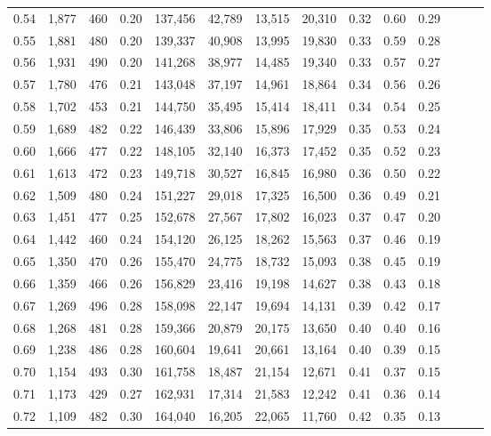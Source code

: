 \begin{tabular}{rrrrrrrrrrrrrr}
0.54 &  1,877 &    460 &  0.20 &  137,456 &   42,789 &  13,515 &  20,310 &  0.32 &  0.60 &      0.29 \\
0.55 &  1,881 &    480 &  0.20 &  139,337 &   40,908 &  13,995 &  19,830 &  0.33 &  0.59 &      0.28 \\
0.56 &  1,931 &    490 &  0.20 &  141,268 &   38,977 &  14,485 &  19,340 &  0.33 &  0.57 &      0.27 \\
0.57 &  1,780 &    476 &  0.21 &  143,048 &   37,197 &  14,961 &  18,864 &  0.34 &  0.56 &      0.26 \\
0.58 &  1,702 &    453 &  0.21 &  144,750 &   35,495 &  15,414 &  18,411 &  0.34 &  0.54 &      0.25 \\
0.59 &  1,689 &    482 &  0.22 &  146,439 &   33,806 &  15,896 &  17,929 &  0.35 &  0.53 &      0.24 \\
0.60 &  1,666 &    477 &  0.22 &  148,105 &   32,140 &  16,373 &  17,452 &  0.35 &  0.52 &      0.23 \\
0.61 &  1,613 &    472 &  0.23 &  149,718 &   30,527 &  16,845 &  16,980 &  0.36 &  0.50 &      0.22 \\
0.62 &  1,509 &    480 &  0.24 &  151,227 &   29,018 &  17,325 &  16,500 &  0.36 &  0.49 &      0.21 \\
0.63 &  1,451 &    477 &  0.25 &  152,678 &   27,567 &  17,802 &  16,023 &  0.37 &  0.47 &      0.20 \\
0.64 &  1,442 &    460 &  0.24 &  154,120 &   26,125 &  18,262 &  15,563 &  0.37 &  0.46 &      0.19 \\
0.65 &  1,350 &    470 &  0.26 &  155,470 &   24,775 &  18,732 &  15,093 &  0.38 &  0.45 &      0.19 \\
0.66 &  1,359 &    466 &  0.26 &  156,829 &   23,416 &  19,198 &  14,627 &  0.38 &  0.43 &      0.18 \\
0.67 &  1,269 &    496 &  0.28 &  158,098 &   22,147 &  19,694 &  14,131 &  0.39 &  0.42 &      0.17 \\
0.68 &  1,268 &    481 &  0.28 &  159,366 &   20,879 &  20,175 &  13,650 &  0.40 &  0.40 &      0.16 \\
0.69 &  1,238 &    486 &  0.28 &  160,604 &   19,641 &  20,661 &  13,164 &  0.40 &  0.39 &      0.15 \\
0.70 &  1,154 &    493 &  0.30 &  161,758 &   18,487 &  21,154 &  12,671 &  0.41 &  0.37 &      0.15 \\
0.71 &  1,173 &    429 &  0.27 &  162,931 &   17,314 &  21,583 &  12,242 &  0.41 &  0.36 &      0.14 \\
0.72 &  1,109 &    482 &  0.30 &  164,040 &   16,205 &  22,065 &  11,760 &  0.42 &  0.35 &      0.13 \\

\end{tabular}
